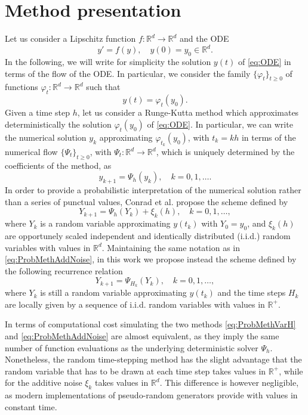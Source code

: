 \documentclass{siamart1116}
\numberwithin{theorem}{section}
\renewcommand{\phi}{\varphi}
\newcommand{\R}{\mathbb{R}}
\begin{document}
\section{Method presentation}\label{sec:MethodIntro}

Let us consider a Lipschitz function $f\colon\R^d\to\R^d$ and the ODE
\begin{equation}\label{eq:ODE}
	y' = f(y), \quad y(0) = y_0 \in \R^d.
\end{equation}
In the following, we will write for simplicity the solution $y(t)$ of \eqref{eq:ODE} in terms of the flow of the ODE. In particular, we consider the family  $\{\phi_t\}_{t \geq 0}$ of functions $\phi_t\colon\R^d\to\R^d$ such that 
\begin{equation}
	y(t) = \phi_t(y_0).
\end{equation}
Given a time step $h$, let us consider a Runge-Kutta method which approximates deterministically the solution $\phi_t(y_0)$ of \eqref{eq:ODE}. In particular, we can write the numerical solution $y_k$ approximating $\phi_{t_k}(y_0)$, with $t_k = kh$ in terms of the numerical flow $\{\Psi_t\}_{t \geq 0}$, with $\Psi_t\colon\R^d\to\R^d$, which is uniquely determined by the coefficients of the method, as
\begin{equation}
	y_{k+1} = \Psi_h(y_k), \quad k = 0, 1, \ldots.
\end{equation}
In order to provide a probabilistic interpretation of the numerical solution rather than a series of punctual values, Conrad et al. propose the scheme defined by
\begin{equation}\label{eq:ProbMethAddNoise}
	Y_{k+1} = \Psi_h(Y_{k}) + \xi_k(h), \quad k = 0, 1, \ldots,
\end{equation}
where $Y_k$ is a random variable approximating $y(t_k)$ with $Y_0 = y_0$, and $\xi_k(h)$ are opportunely scaled independent and identically distributed (i.i.d.) random variables with values in $\R^d$. Maintaining the same notation as in \eqref{eq:ProbMethAddNoise}, in this work we propose instead the scheme defined by the following recurrence relation
\begin{equation}\label{eq:ProbMethVarH}
	Y_{k+1} = \Psi_{H_k}(Y_k), \quad k = 0, 1, \ldots,
\end{equation}
where $Y_k$ is still a random variable approximating $y(t_k)$ and the time steps $H_k$ are locally given by a sequence  of i.i.d. random variables with values in $\R^+$.
\begin{remark} In terms of computational cost simulating the two methods \eqref{eq:ProbMethVarH} and \eqref{eq:ProbMethAddNoise} are almost equivalent, as they imply the same number of function evaluations as the underlying deterministic solver $\Psi_h$. Nonetheless, the random time-stepping method has the slight advantage that the random variable that has to be drawn at each time step takes values in $\R^+$, while for the additive noise $\xi_k$ takes values in $\R^d$. This difference is however negligible, as modern implementations of pseudo-random generators provide with values in constant time.
\end{remark}
\end{document}
